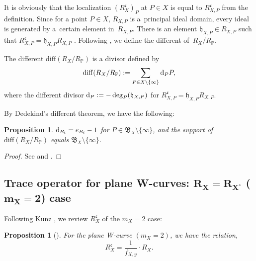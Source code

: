 \documentclass[10pt,a4paper]{amsart}
\def\PP{{\mathbb P}}
\def\fB{{\mathfrak B}}
\def\fc{{\mathfrak c}}
\def\fh{{\mathfrak h}}
\def\diff{\mathrm{diff}}
\numberwithin{equation}{section}
\newtheorem{Proposition}[Theorem]{Proposition}
 { \theoremstyle{definition}
\newtheorem{Definition}[Theorem]{Definition}
\newtheorem{Note}[Theorem]{Note}
\newtheorem{Example}[Theorem]{Example}
\newtheorem{Remark}[Theorem]{Remark} }
\begin{document}
It is obviously that the localization $(R_{X}^{\fc})_P$ at $P\in X$ is equal to $R_{X,P}^{\fc}$ from the definition.
Since for a point $P\in X$, $R_{X,P}$ is a~principal ideal domain, every ideal is generated by a~certain element in~$R_{X,P}$.
There is an element $\fh_{X,P} \in R_{X,P}$ such that $R_{X,P}^{\fc}=\fh_{X,P}R_{X,P}$ \cite[Proposition~3.4.2]{Stichtenoth}.
Following \cite[Definition~3.4.3]{Stichtenoth}, we define the different of~$R_X/R_\PP$.

\begin{Definition}\label{2df:2.32}
The different $\diff(R_X/R_\PP)$ is a divisor defined by
\[
\diff(R_X/R_\PP):=\sum_{P\in X\setminus\{\infty\}} {\rm d}_{P} P,
\]
where the different divisor ${\rm d}_{P}:= -\deg_P(\fh_{X,P})$ for $R_{X,P}^\fc =\fh_{X,P} R_{X,P}$.
\end{Definition}

By Dedekind's different theorem, we have the following:
\begin{Proposition}\label{2pr:DedekindDiff1}
${\rm d}_{B_i}=e_{B_i}-1$ for $P \in \fB_X\setminus\{\infty\}$, and the support of $\diff(R_X/R_\PP)$ equals $\fB_X\setminus \{\infty\}$.
\end{Proposition}

\begin{proof}See \cite[Theorem 15.11]{Kunz2004} and \cite[Theorem 3.5.1]{Stichtenoth}.
\end{proof}

\subsection[Trace operator for plane W-curves: R\_X=R\_\{X\^{}circ\} (m\_X=2) case]{Trace operator for plane W-curves: $\boldsymbol{R_X = R_{X^\circ}}$ ($\boldsymbol{m_X=2}$) case}\label{2sssec:m_X=2}

Following Kunz \cite[Theorem 15.1]{Kunz2004}, we review $R_X^\fc$ of the $m_X=2$ case:
\begin{Proposition}[{\cite[Theorem 15.1]{Kunz2004}}]\label{2pr:Kunz_m2}
For the plane W-curve $(m_X=2)$, we have the relation,%
\begin{equation}
 R_X^\fc = \frac{1}{f_{X,y}}\cdot R_X.\label{2eq:RXfc}
\end{equation}
\end{Proposition}
\end{document}
